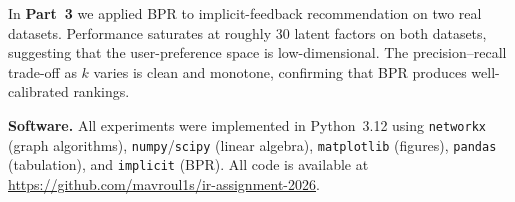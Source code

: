 \documentclass[12pt, a4paper]{article}
\begin{document}
In \textbf{Part~3} we applied BPR to implicit-feedback recommendation on
two real datasets. Performance saturates at roughly 30 latent factors on
both datasets, suggesting that the user-preference space is low-dimensional.
The precision--recall trade-off as $k$ varies is clean and monotone,
confirming that BPR produces well-calibrated rankings.

\textbf{Software.} All experiments were implemented in Python~3.12 using
\texttt{networkx} (graph algorithms), \texttt{numpy}/\texttt{scipy}
(linear algebra), \texttt{matplotlib} (figures), \texttt{pandas}
(tabulation), and \texttt{implicit} (BPR).
All code is available at
\url{https://github.com/mavroul1s/ir-assignment-2026}.



\end{document}
